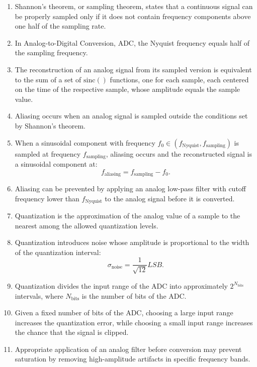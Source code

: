 \begin{enumerate}[label=\arabic*.]
    \item Shannon's theorem, or sampling theorem, states that a continuous signal can be properly sampled only if it does not contain frequency components above one half of the sampling rate.
    
    \item In Analog-to-Digital Conversion, ADC, the Nyquist frequency equals half of the sampling frequency.
    
    \item The reconstruction of an analog signal from its sampled version is equivalent to the sum of a set of $\mathrm{sinc}()$ functions, one for each sample, each centered on the time of the respective sample, whose amplitude equals the sample value.
    
    \item Aliasing occurs when an analog signal is sampled outside the conditions set by Shannon's theorem.
    
    \item When a sinusoidal component with frequency $f_0 \in (f_{\text{Nyquist}}, f_{\text{sampling}})$ is sampled at frequency $f_{\text{sampling}}$, aliasing occurs and the reconstructed signal is a sinusoidal component at:
    \[
    f_{\text{aliasing}}
    =
    f_{\text{sampling}} - f_0.
    \]
    
    \item Aliasing can be prevented by applying an analog low-pass filter with cutoff frequency lower than $f_{\text{Nyquist}}$ to the analog signal before it is converted.
    
    \item Quantization is the approximation of the analog value of a sample to the nearest among the allowed quantization levels.
    
    \item Quantization introduces noise whose amplitude is proportional to the width of the quantization interval:
    \[
    \sigma_{\text{noise}} =
    \frac{1}{\sqrt{12}}LSB.
    \]
    
    \item Quantization divides the input range of the ADC into approximately $2^{N_{\text{bits}}}$ intervals, where $N_{\text{bits}}$ is the number of bits of the ADC.
    
    \item Given a fixed number of bits of the ADC, choosing a large input range increases the quantization error, while choosing a small input range increases the chance that the signal is clipped.
    
    \item Appropriate application of an analog filter before conversion may prevent saturation by removing high-amplitude artifacts in specific frequency bands.
\end{enumerate}

